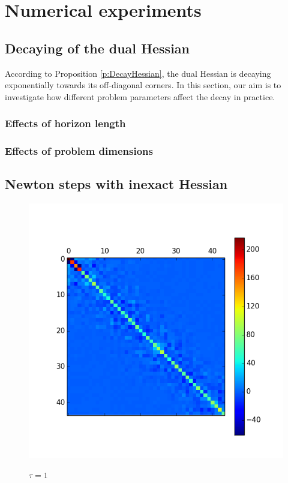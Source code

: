 \section{Numerical experiments}

\subsection{Decaying of the dual Hessian}
According to Proposition \ref{p:DecayHessian}, the dual Hessian is decaying exponentially towards its off-diagonal corners. In this section, our aim is to investigate how different problem parameters affect the decay in practice.

\subsubsection{Effects of horizon length}

\subsubsection{Effects of problem dimensions}

\subsection{Newton steps with inexact Hessian}

\begin{figure}[h]
  \centering
  \includegraphics[scale = 0.5]{./Figures/SmallProblemLargeTau.png}\\
  \caption{$\tau = 1$}
  \label{f:SmallProblemLargeTau}
\end{figure}

